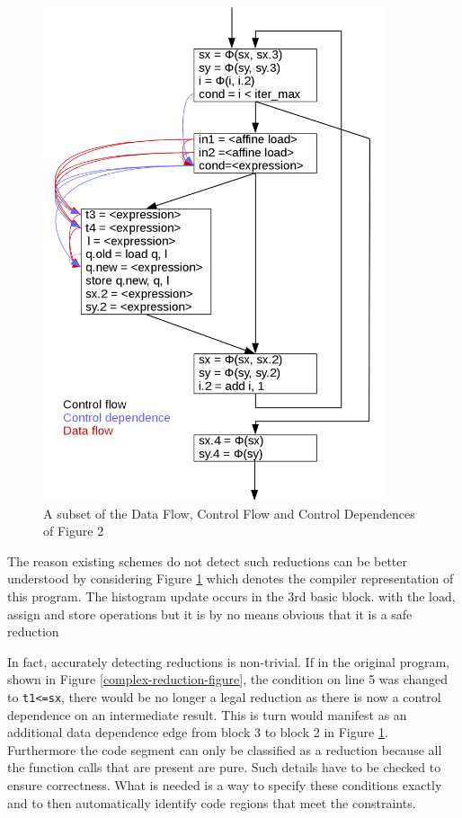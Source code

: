 \begin{figure}[p]
\centering
 \includegraphics[width=0.9\textwidth]{figures/nicepicture2.png}
 \caption{A subset of the Data Flow, Control Flow and Control Dependences of Figure 2}
 \label{nice-picture2}
 \end{figure}

The reason existing schemes do not detect such reductions can be better understood by considering 
Figure \ref{nice-picture2} which denotes the compiler representation of this 
program.  The histogram update occurs in the 3rd basic block. with the load, assign and store operations but it is by no means obvious that it is a safe reduction

In fact, accurately detecting reductions is non-trivial.  If in the
 original program, shown in Figure \ref{complex-reduction-figure}, the
 condition on line 5 was changed to {\tt t1<=sx}, there would be no
 longer a legal reduction as there is now a control dependence on an
 intermediate result. This is turn would manifest as an additional
 data dependence edge from block 3 to block 2 in
 Figure \ref{nice-picture2}.
Furthermore the code segment can only be classified as a reduction because all the function calls that are present are pure.
 Such details have to be checked to ensure
 correctness. What is needed is a way to specify these conditions
 exactly and to then automatically identify code regions that meet the
 constraints.

